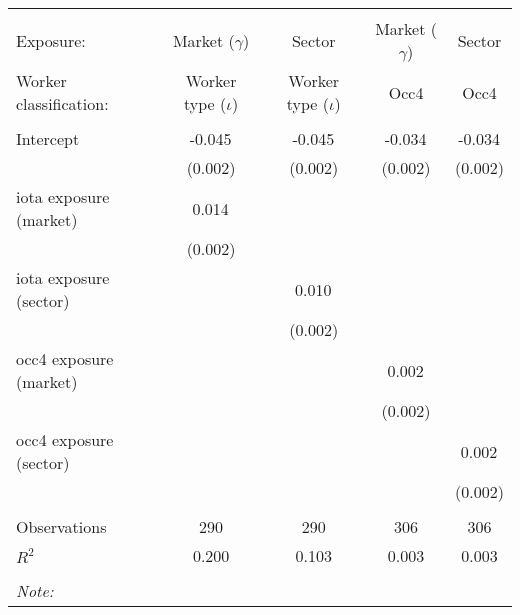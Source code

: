 \begin{tabular}{@{\extracolsep{5pt}}lcccc}
\\[-1.8ex]\hline
\hline \\[-1.8ex]
\hline \\[-1.8ex]
 Exposure: & Market ($\gamma$) & Sector & Market ($\gamma$) & Sector \\
 Worker classification: & Worker type ($\iota$) & Worker type ($\iota$) & Occ4 & Occ4 \\
 \hline &  &  &  &  \\
 Intercept & -0.045$^{}$ & -0.045$^{}$ & -0.034$^{}$ & -0.034$^{}$ \\
  & (0.002) & (0.002) & (0.002) & (0.002) \\
 iota exposure (market) & 0.014$^{}$ & & & \\
  & (0.002) & & & \\
 iota exposure (sector) & & 0.010$^{}$ & & \\
  & & (0.002) & & \\
 occ4 exposure (market) & & & 0.002$^{}$ & \\
  & & & (0.002) & \\
 occ4 exposure (sector) & & & & 0.002$^{}$ \\
  & & & & (0.002) \\
\hline \\[-1.8ex]
 Observations & 290 & 290 & 306 & 306 \\
 $R^2$ & 0.200 & 0.103 & 0.003 & 0.003 \\
\hline
\hline \\[-1.8ex]
\textit{Note:}\end{tabular}